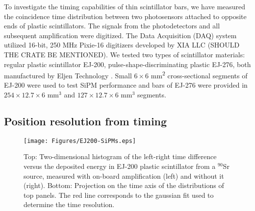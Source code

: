 To  investigate the timing capabilities of thin scintillator bars, we have measured the coincidence time distribution between two photosensors attached to opposite ends of plastic scintillators. The signals from the photodetectors and all subsequent amplification were digitized. The Data Acquisition (DAQ) system utilized 16-bit, 250 MHz Pixie-16 digitizers developed by XIA LLC \cite{XIA} (SHOULD THE CRATE BE MENTIONED).
We tested two types of scintillator materials: regular plastic scintillator EJ-200, pulse-shape-discriminating plastic EJ-276, both manufactured by Eljen Technology \cite{eljen}. Small $6\times6$ mm\textsuperscript{2} cross-sectional segments of EJ-200 were used to test SiPM performance and bars of EJ-276 were provided in $254\times12.7\times6$ mm$^{3}$ and $127\times12.7\times6$ mm$^{3}$ segments.



\subsection{Position resolution from timing}
\begin{figure}[hbt]
\centering
\texttt{[image: Figures/EJ200-SiPMs.eps]}
\caption{Top: Two-dimensional histogram of the left-right time difference versus the deposited energy in EJ-200 plastic scintillator from a $^{90}$Sr source, measured with on-board amplification (left) and without it (right). Bottom: Projection on the time axis of the  distributions of top panels. The red line corresponds to the gaussian fit used to determine the time resolution.}
\label{fig:SiPMtiming}
\end{figure}

